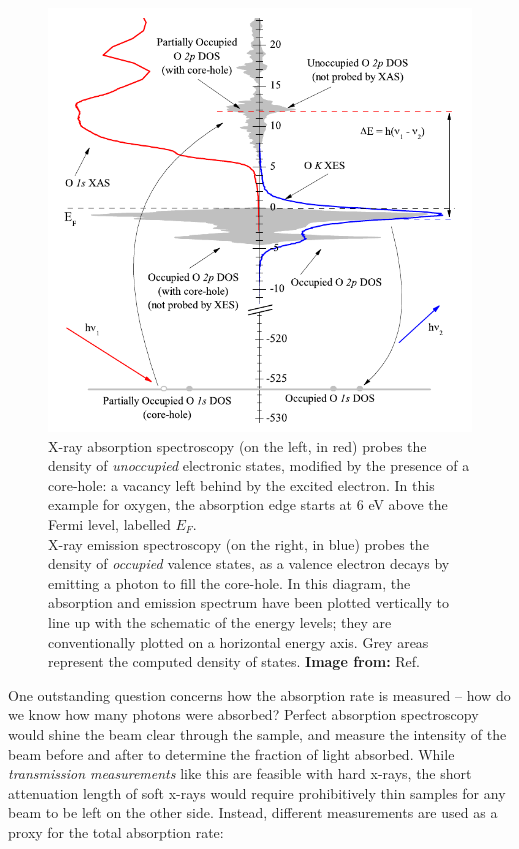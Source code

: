 \begin{figure}[htb] %
   \centering
   \includegraphics[scale=0.8]{../data/Chapter1/1i_sxsProcesses/1i.pdf} 
   \caption{X-ray absorption spectroscopy (on the left, in red) probes the density of \emph{unoccupied} electronic states, modified by the presence of a core-hole: a vacancy left behind by the excited electron.  In this example for oxygen, the absorption edge starts at 6 eV above the Fermi level, labelled $E_F$.\\X-ray emission spectroscopy (on the right, in blue) probes the density of \emph{occupied} valence states, as a valence electron decays by emitting a photon to fill the core-hole.  In this diagram, the absorption and emission spectrum have been plotted vertically to line up with the schematic of the energy levels; they are conventionally plotted on a horizontal energy axis.  Grey areas represent the computed density of states.  \textbf{Image from: }Ref. \cite{McL10}}
   \label{1i}
\end{figure}

One outstanding question concerns how the absorption rate is measured -- how do we know how many photons were absorbed?  Perfect absorption spectroscopy would shine the beam clear through the sample, and measure the intensity of the beam before and after to determine the fraction of light absorbed.  While \emph{transmission measurements} like this are feasible with hard x-rays, the short attenuation length of soft x-rays would require prohibitively thin samples for any beam to be left on the other side.  Instead, different measurements are used as a proxy for the total absorption rate:
